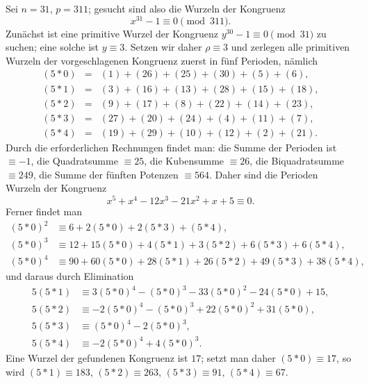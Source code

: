 \documentclass[12pt]{article}
\begin{document}
Sei $n=31$, $p=311$; gesucht sind also die Wurzeln der Kongruenz
\[
x^{31}-1\equiv 0\pmod {311}.
\]
Zunächst ist eine primitive Wurzel der Kongruenz $y^{30}-1\equiv 0\pmod {31}$ zu suchen; eine solche ist $y\equiv 3$. Setzen wir daher $\rho\equiv 3$ und zerlegen alle primitiven Wurzeln der vorgeschlagenen Kongruenz zuerst in fünf Perioden, nämlich
\[
\begin{array}{rcl}
(5*0)&=&(1)+(26)+(25)+(30)+(5)+(6),\\
(5*1)&=&(3)+(16)+(13)+(28)+(15)+(18),\\
(5*2)&=&(9)+(17)+(8)+(22)+(14)+(23),\\
(5*3)&=&(27)+(20)+(24)+(4)+(11)+(7),\\
(5*4)&=&(19)+(29)+(10)+(12)+(2)+(21).
\end{array}
\]
Durch die erforderlichen Rechnungen findet man: die Summe der Perioden ist $\equiv -1$, die Quadratsumme $\equiv 25$, die Kubensumme $\equiv 26$, die Biquadratsumme $\equiv 249$, die Summe der fünften Potenzen $\equiv 564$. Daher sind die Perioden Wurzeln der Kongruenz
\[
x^5+x^4-12x^3-21x^2+x+5\equiv 0.
\]
Ferner findet man
\[
\begin{aligned}
(5*0)^2&\equiv 6+2(5*0)+2(5*3)+(5*4),\\
(5*0)^3&\equiv 12+15(5*0)+4(5*1)+3(5*2)+6(5*3)+6(5*4),\\
(5*0)^4&\equiv 90+60(5*0)+28(5*1)+26(5*2)+49(5*3)+38(5*4),
\end{aligned}
\]
und daraus durch Elimination
\[
\begin{aligned}
5(5*1)&\equiv 3(5*0)^4-(5*0)^3-33(5*0)^2-24(5*0)+15,\\
5(5*2)&\equiv -2(5*0)^4-(5*0)^3+22(5*0)^2+31(5*0),\\
5(5*3)&\equiv (5*0)^4-2(5*0)^3,\\
5(5*4)&\equiv -2(5*0)^4+4(5*0)^3.
\end{aligned}
\]
Eine Wurzel der gefundenen Kongruenz ist $17$; setzt man daher $(5*0)\equiv 17$, so wird $(5*1)\equiv 183$, $(5*2)\equiv 263$, $(5*3)\equiv 91$, $(5*4)\equiv 67$.
\end{document}
